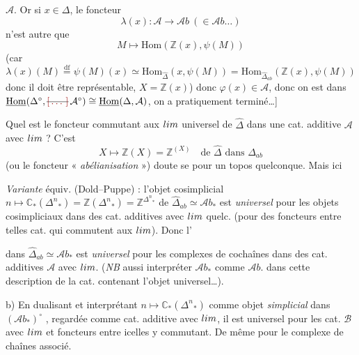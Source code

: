 \documentclass[11pt,a4paper]{article}
\begin{document}
$\mathcal{A}$. Or si $x \in \Delta$, le foncteur \struck{\ill{}}
\[
  \lambda(x) : \mathcal{A} \to \mathcal{A}b \ (\in \mathcal{A}b \ldots)
\]
n'est autre que
\[
  M \longmapsto \mathrm{Hom}(\mathbb{Z}(x), \psi(M))
\]
(car
\[
  \lambda(x)(M) \overset{\text{df}}{=} \psi(M)(x) \simeq \mathrm{Hom}_{\widehat{\Delta}}(x, \psi(M))
  = \mathrm{Hom}_{\widehat{\Delta}_{ab}}(\mathbb{Z}(x), \psi(M))
\]
donc il doit être représentable, \struck{\ill{}}  
$X = \mathbb{Z}(x)$) donc  $\varphi(x) \in \mathcal{A}$, donc on est
dans $\underline{\mathrm{Hom}}(\Delta^{\circ}, \text{\struck{\ill{}}}\,\mathcal{A}^{\circ}) \cong \underline{\mathrm{Hom}}(\Delta, \mathcal{A})$,
on a pratiquement terminé…]

Quel est  le foncteur commutant aux $\varinjlim$ 
universel de $\widehat{\Delta}$ dans une cat. additive $\mathcal{A}$ avec $\varinjlim$ ?
C'est
\[
  X \longmapsto \mathbb{Z}(X) = \mathbb{Z}^{(X)} \quad \text{de } \widehat{\Delta} \text{ dans } \widehat{\Delta}_{ab}
\]
(ou le foncteur « \emph{abélianisation} »)  doute se 
pour un topos quelconque. 
Mais ici 

\emph{Variante} équiv. \struck{\ill{}}  (Dold--Puppe) : l'objet cosimplicial
\struck{\ill{}} $n \longmapsto \mathbb{C}_{*}(\Delta^{n}{}_{*}) = \mathbb{Z}(\Delta^{n}{}_{*}) = \mathbb{Z}^{\Delta^{n}{}_{*}}$
de $\widehat{\Delta}_{ab} \simeq \mathcal{A}b_{*}$ est \emph{universel} pour les objets
cosimpliciaux dans des cat. additives avec $\varinjlim$ quelc. (pour des foncteurs entre
telles cat. qui commutent aux $\varinjlim$). Donc l' 

dans $\widehat{\Delta}_{ab} \simeq \mathcal{A}b_{*}$ est \emph{universel} pour les
complexes de cochaînes dans des cat. additives $\mathcal{A}$ avec $\varinjlim$. \ill{}
(\emph{NB}   aussi interpréter $\mathcal{A}b_{*}$ comme
$\mathcal{A}b.$ dans cette description de la cat. contenant l'objet universel…).

b) En dualisant et interprétant $n \longmapsto \mathbb{C}_{*}(\Delta^{n}{}_{*})$ comme
objet \emph{simplicial} dans $(\mathcal{A}b_{*})^{\circ}$ ,
\struck{\ill{}} regardée comme cat. additive avec $\varprojlim$, il est universel pour
les cat. $\mathcal{B}$ avec $\varprojlim$ et foncteurs entre icelles y commutant. De
même pour le complexe de chaînes associé.
\end{document}
